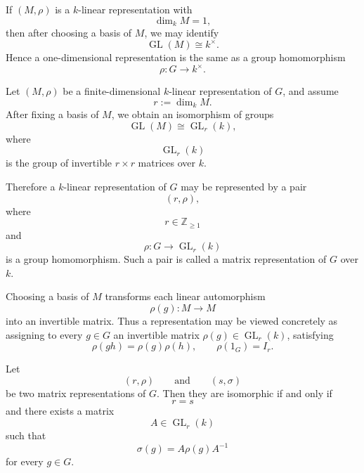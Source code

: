 \begin{example}
    If \((M,\rho)\) is a \(k\)-linear representation with
    \[
        \dim_k M=1,
    \]
    then after choosing a basis of \(M\), we may identify
    \[
        \operatorname{GL}(M)\cong k^\times.
    \]
    Hence a one-dimensional representation is the same as a group homomorphism
    \[
        \rho:G\longrightarrow k^\times.
    \]
\end{example}

Let \((M,\rho)\) be a finite-dimensional \(k\)-linear representation of \(G\), and
assume
\[
    r:=\dim_k M.
\]
After fixing a basis of \(M\), we obtain an isomorphism of groups
\[
    \operatorname{GL}(M)\cong \operatorname{GL}_r(k),
\]
where
\[
    \operatorname{GL}_r(k)
\]
is the group of invertible \(r\times r\) matrices over \(k\).

Therefore a \(k\)-linear representation of \(G\) may be represented by a pair
\[
    (r,\rho),
\]
where
\[
    r\in \mathbb{Z}_{\geq 1}
\]
and
\[
    \rho:G\longrightarrow \operatorname{GL}_r(k)
\]
is a group homomorphism. Such a pair is called a matrix representation of \(G\)
over \(k\).

\begin{remark}
    Choosing a basis of \(M\) transforms each linear automorphism
    \[
        \rho(g):M\longrightarrow M
    \]
    into an invertible matrix. Thus a representation may be viewed concretely as
    assigning to every \(g\in G\) an invertible matrix \(\rho(g)\in
    \operatorname{GL}_r(k)\), satisfying
    \[
        \rho(gh)=\rho(g)\rho(h),
        \qquad
        \rho(1_G)=I_r.
    \]
\end{remark}

\begin{proposition}
    Let
    \[
        (r,\rho)
        \qquad\text{and}\qquad
        (s,\sigma)
    \]
    be two matrix representations of \(G\). Then they are isomorphic if and only
    if
    \[
        r=s
    \]
    and there exists a matrix
    \[
        A\in \operatorname{GL}_r(k)
    \]
    such that
    \[
        \sigma(g)=A\rho(g)A^{-1}
    \]
    for every \(g\in G\).
\end{proposition}

